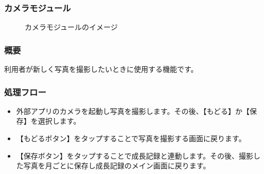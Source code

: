 \documentclass[a4j]{jarticle}
\begin{document}
\subsubsection{カメラモジュール\label{camera}}
\begin{figure}[H]
    \begin{center}
    \caption {カメラモジュールのイメージ}
    \label{functionselection}
    \end{center}
\end{figure}

\subsubsection*{概要}
利用者が新しく写真を撮影したいときに使用する機能です。

\subsubsection*{処理フロー}
\begin{itemize}
\item 外部アプリのカメラを起動し写真を撮影します。その後、【もどる】か【保存】を選択します。
\item 【もどるボタン】をタップすることで写真を撮影する画面に戻ります。
\item 【保存ボタン】をタップすることで成長記録と連動します。その後、撮影した写真を月ごとに保存し成長記録のメイン画面に戻ります。
\end{itemize}
\end{document}
